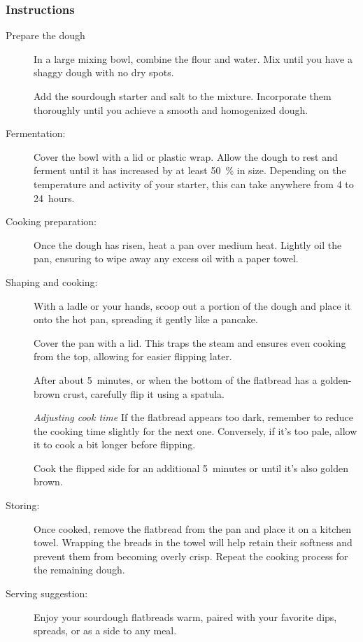 \subsubsection*{Instructions}
\begin{description}
\item[Prepare the dough] In a large mixing bowl, combine the flour and water.
Mix until you have a shaggy dough with no dry spots.

Add the sourdough starter and salt to the mixture. Incorporate them thoroughly
until you achieve a smooth and homogenized dough.

\item[Fermentation:] Cover the bowl with a lid or plastic wrap. Allow the dough
    to rest and ferment until it has increased by at least \qty{50}{\percent}
    in size.  Depending on the temperature and activity of your starter, this
    can take anywhere from 4 to 24~hours.

\item[Cooking preparation:] Once the dough has risen, heat a pan over medium heat.
Lightly oil the pan, ensuring to wipe away any excess oil with a paper towel.

\item[Shaping and cooking:] With a ladle or your hands, scoop out a portion of
the dough and place it onto the hot pan, spreading it gently like a pancake.

Cover the pan with a lid. This traps the steam and ensures even cooking
from the top, allowing for easier flipping later.

After about 5~minutes, or when the bottom of the flatbread has a
golden-brown crust, carefully flip it using a spatula.

\emph{Adjusting cook time} If the flatbread appears too dark,
remember to reduce the cooking time slightly for the next one.
Conversely, if it's too pale, allow it to cook a bit longer before flipping.

Cook the flipped side for an additional 5~minutes or until it's also golden
brown.

\item[Storing:] Once cooked, remove the flatbread from the pan and place it on a
kitchen towel. Wrapping the breads in the towel will help retain their
softness and prevent them from becoming overly crisp.
Repeat the cooking process for the remaining dough.

\item[Serving suggestion:] Enjoy your sourdough flatbreads warm,
paired with your favorite dips, spreads, or as a side to any meal.

\end{description}
